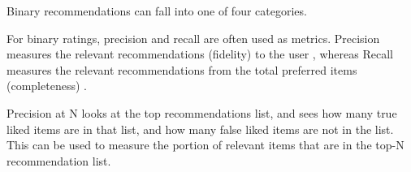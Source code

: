 Binary recommendations can fall into one of four categories. 

For binary ratings, precision and recall are often used as metrics. Precision measures the relevant recommendations (fidelity) to the user , whereas Recall measures the relevant recommendations from the total preferred items (completeness) . 

Precision at N looks at the top recommendations list, and sees how many true liked items are in that list, and how many false liked items are not in the list. This can be used to measure the portion of relevant items that are in the top-N recommendation list.





